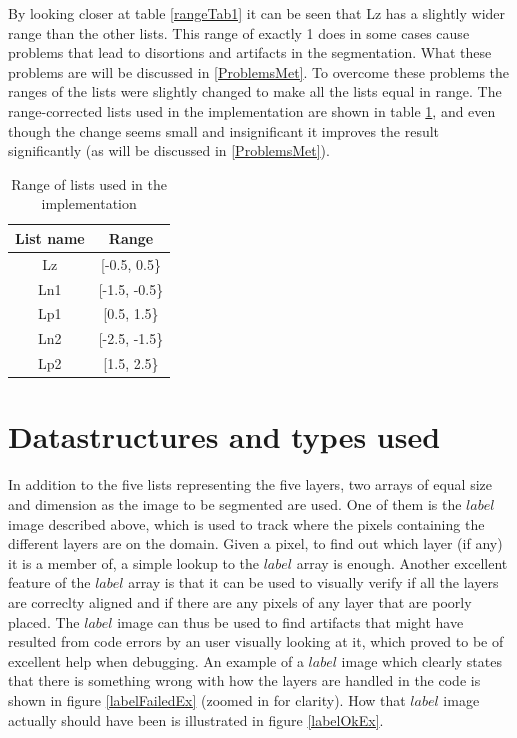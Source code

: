 By looking closer at table \ref{rangeTab1} it can be seen that Lz has a slightly wider range than the other lists. This range of exactly 1 does in some cases cause problems that lead to disortions and artifacts in the segmentation. What these problems are will be discussed in \ref{ProblemsMet}. To overcome these problems the ranges of the lists were slightly changed to make all the lists equal in range. The range-corrected lists used in the implementation are shown in table \ref{rangeTab2}, and even though the change seems small and insignificant it improves the result significantly (as will be discussed in \ref{ProblemsMet}).

\begin{table}[h] %
	\centering
	\begin{tabular}{| c | c |} 
	\hline
	List name & Range\\
	\hline
	Lz & [-0.5, 0.5\}\\
	Ln1 & [-1.5, -0.5\}\\
	Lp1 & [0.5, 1.5\}\\
	Ln2 & [-2.5, -1.5\}\\
	Lp2 & [1.5, 2.5\}\\
	\hline
	\end{tabular}
	\caption{Range of lists used in the implementation}
	\label{rangeTab2}
\end{table}

\section{Datastructures and types used}
In addition to the five lists representing the five layers, two arrays of equal size and dimension as the image to be segmented are used. One of them is the $label$ image described above, which is used to track where the pixels containing the different layers are on the domain. Given a pixel, to find out which layer (if any) it is a member of, a simple lookup to the $label$ array is enough. Another excellent feature of the $label$ array is that it can be used to visually verify if all the layers are correclty aligned and if there are any pixels of any layer that are poorly placed. The $label$ image can thus be used to find artifacts that might have resulted from code errors by an user visually looking at it, which proved to be of excellent help when debugging. An example of a $label$ image which clearly states that there is something wrong with how the layers are handled in the code is shown in figure \ref{labelFailedEx} (zoomed in for clarity). How that $label$ image actually should have been is illustrated in figure \ref{labelOkEx}.

